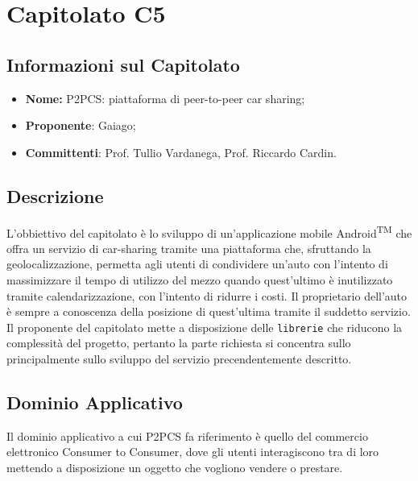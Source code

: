\section{Capitolato C5}
\subsection{Informazioni sul Capitolato}
\begin{itemize}
	\item \textbf{Nome:} P2PCS: piattaforma di peer-to-peer car sharing;
	\item \textbf{Proponente}: Gaiago;
	\item \textbf{Committenti}: Prof. Tullio Vardanega, Prof. Riccardo Cardin.
\end{itemize}
\subsection{Descrizione}
L'obbiettivo del capitolato è lo sviluppo di un'applicazione mobile Android\textsuperscript{TM} che offra un servizio di 
car-sharing tramite una piattaforma che, sfruttando la geolocalizzazione, permetta agli utenti di condividere un'auto con 
l'intento di massimizzare il tempo di utilizzo del mezzo quando quest'ultimo è inutilizzato tramite calendarizzazione, 
con l'intento di ridurre i costi. Il proprietario dell'auto è sempre a conoscenza della posizione di quest'ultima tramite 
il suddetto servizio. Il proponente del capitolato mette a disposizione delle \texttt{librerie} che riducono la 
complessità del progetto, pertanto la parte richiesta si concentra sullo principalmente sullo sviluppo del servizio precendentemente
descritto.
\subsection{Dominio Applicativo}
Il dominio applicativo a cui P2PCS fa riferimento è quello del commercio elettronico Consumer to Consumer, dove gli utenti interagiscono tra di loro mettendo a disposizione un oggetto che vogliono vendere o prestare.
